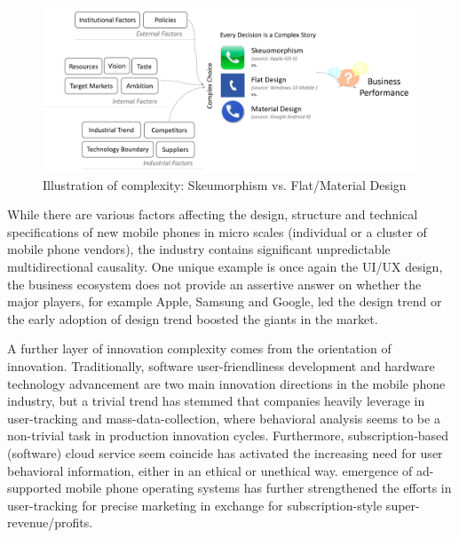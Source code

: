 \documentclass[utf8,english]{gradu3}
\begin{document}
\begin{figure}[htb]
    \centering
    \includegraphics[width=0.99\textwidth]{design.png}
    \caption{Illustration of complexity: Skeumorphism vs. Flat/Material Design}
    \label{fig:design}
\end{figure}

While there are various factors affecting the design, structure and technical specifications of new mobile phones in micro scales (individual or a cluster of mobile phone vendors), the industry contains significant unpredictable multidirectional causality. One unique example is once again the UI/UX design, the business ecosystem does not provide an assertive answer on whether the major players, for example Apple, Samsung and Google, led the design trend or the early adoption of design trend boosted the giants in the market.

A further layer of innovation complexity comes from the orientation of innovation. Traditionally, software user-friendliness development and hardware technology advancement are two main innovation directions in the mobile phone industry, but a trivial trend has stemmed that companies heavily leverage in user-tracking and mass-data-collection, where behavioral analysis seems to be a non-trivial task in production innovation cycles. Furthermore, subscription-based (software) cloud service seem coincide has activated the increasing need for user behavioral information, either in an ethical or unethical way. emergence of ad-supported mobile phone operating systems has further strengthened the efforts in user-tracking for precise marketing in exchange for subscription-style super-revenue/profits. 
\end{document}
